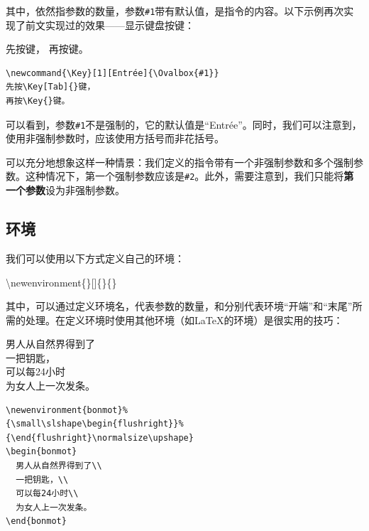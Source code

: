 其中，依然指参数的数量，参数\verb|#1|带有默认值，是指令的内容。以下示例再次实现了前文实现过的效果——显示键盘按键：

\begin{codelist}[4.22]{
  \newcommand{\Key}[1][Entrée]{\Ovalbox{#1}} 
  先按\Key[Tab]{}键，
  再按\Key{}键。
}
\begin{verbatim}
\newcommand{\Key}[1][Entrée]{\Ovalbox{#1}} 
先按\Key[Tab]{}键，
再按\Key{}键。\end{verbatim}
\end{codelist}

可以看到，参数\verb|#1|不是强制的，它的默认值是“Entrée”。同时，我们可以注意到，使用非强制参数时，应该使用方括号而非花括号。

\begin{exclamation}
可以充分地想象这样一种情景：我们定义的指令带有一个非强制参数和多个强制参数。这种情况下，第一个强制参数应该是\verb|#2|。此外，需要注意到，我们只能将\textbf{第一个参数}设为非强制参数。
\end{exclamation}

\subsection{环境}

我们可以使用以下方式定义自己的环境：

\begin{dmd}
\backslash newenvironment\{\}[]\{\}\{\}
\end{dmd}

其中，可以通过定义环境名，代表参数的数量，和分别代表环境“开端”和“末尾”所需的处理。在定义环境时使用其他环境（如\LaTeX 的环境）是很实用的技巧：

\begin{codelist}[4.23]{
  \newenvironment{bonmot}%
{\small\slshape\begin{flushright}}%
{\end{flushright}\normalsize\upshape}
\begin{bonmot}
  男人从自然界得到了\\
  一把钥匙，\\
  可以每24小时\\
  为女人上一次发条。
\end{bonmot}
}
\begin{verbatim}
\newenvironment{bonmot}%
{\small\slshape\begin{flushright}}%
{\end{flushright}\normalsize\upshape}
\begin{bonmot}
  男人从自然界得到了\\
  一把钥匙，\\
  可以每24小时\\
  为女人上一次发条。
\end{bonmot}\end{verbatim}
\end{codelist}


